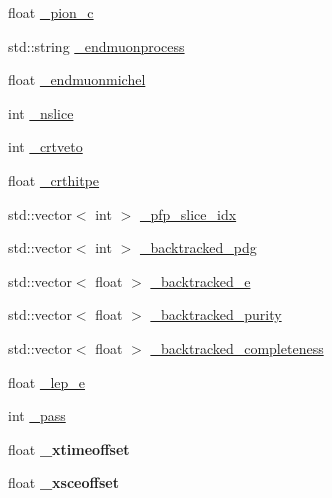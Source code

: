 \begin{DoxyCompactItemize}
\item 
float \hyperlink{classanalysis_1_1DefaultAnalysis_a9978effbcfba62536fc88a73fa985fe9}{\+\_\+pion\+\_\+c}
\item 
std\+::string \hyperlink{classanalysis_1_1DefaultAnalysis_a8cbb24a231e167258d2914f92bc4af22}{\+\_\+endmuonprocess}
\item 
float \hyperlink{classanalysis_1_1DefaultAnalysis_a3797bcb310074825add03ce03175fdc3}{\+\_\+endmuonmichel}
\item 
int \hyperlink{classanalysis_1_1DefaultAnalysis_a3eddf49910782afed7f324755fffe681}{\+\_\+nslice}
\item 
int \hyperlink{classanalysis_1_1DefaultAnalysis_a84ce9904fa527012a65c2be203a38d38}{\+\_\+crtveto}
\item 
float \hyperlink{classanalysis_1_1DefaultAnalysis_a900ec35e3ca4a00d4625a1e632bb6b40}{\+\_\+crthitpe}
\item 
std\+::vector$<$ int $>$ \hyperlink{classanalysis_1_1DefaultAnalysis_acbf0c279993cbefca72f38bc5e9f6627}{\+\_\+pfp\+\_\+slice\+\_\+idx}
\item 
std\+::vector$<$ int $>$ \hyperlink{classanalysis_1_1DefaultAnalysis_a28bd59dce75b8fd3be70bd4996354ae9}{\+\_\+backtracked\+\_\+pdg}
\item 
std\+::vector$<$ float $>$ \hyperlink{classanalysis_1_1DefaultAnalysis_a2c16b4988d0bccf8b7ef96a52c173b80}{\+\_\+backtracked\+\_\+e}
\item 
std\+::vector$<$ float $>$ \hyperlink{classanalysis_1_1DefaultAnalysis_ad08d9b30c434685e350c5f292d4df08b}{\+\_\+backtracked\+\_\+purity}
\item 
std\+::vector$<$ float $>$ \hyperlink{classanalysis_1_1DefaultAnalysis_a60ef3ec6e332c118c088e0203fb858d6}{\+\_\+backtracked\+\_\+completeness}
\item 
float \hyperlink{classanalysis_1_1DefaultAnalysis_ab00e533228597e83340a23d04b986086}{\+\_\+lep\+\_\+e}
\item 
int \hyperlink{classanalysis_1_1DefaultAnalysis_a8d58d05d4b0750a67babff41beece3ac}{\+\_\+pass}
\item 
float {\bfseries \+\_\+xtimeoffset}\hypertarget{classanalysis_1_1DefaultAnalysis_a6ab8489552ea4bfceb0301df80100c65}{}\label{classanalysis_1_1DefaultAnalysis_a6ab8489552ea4bfceb0301df80100c65}

\item 
float {\bfseries \+\_\+xsceoffset}\hypertarget{classanalysis_1_1DefaultAnalysis_a31b53194403f7db533cd349a0f85a62c}{}\label{classanalysis_1_1DefaultAnalysis_a31b53194403f7db533cd349a0f85a62c}


\end{DoxyCompactItemize}
